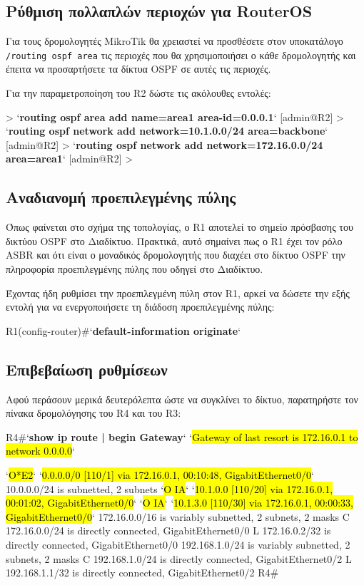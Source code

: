 \documentclass{EdipyLabs} %
\begin{document}
\subsection{Ρύθμιση πολλαπλών περιοχών για RouterOS}

Για τους δρομολογητές MikroTik θα χρειαστεί να προσθέσετε στον υποκατάλογο \texttt{/routing ospf area} τις περιοχές που θα χρησιμοποιήσει ο κάθε δρομολογητής και έπειτα να προσαρτήσετε τα δίκτυα OSPF σε αυτές τις περιοχές. 

Για την παραμετροποίηση του R2 δώστε τις ακόλουθες εντολές:

\begin{CommandBox}
[admin@R2] > `\textbf{routing ospf area add name=area1 area-id=0.0.0.1}`
[admin@R2] > `\textbf{routing ospf network add network=10.1.0.0/24 area=backbone}`
[admin@R2] > `\textbf{routing ospf network add network=172.16.0.0/24 area=area1}`
[admin@R2] >
\end{CommandBox}

\subsection{Αναδιανομή προεπιλεγμένης πύλης}
Όπως φαίνεται στο σχήμα της τοπολογίας, ο R1 αποτελεί το σημείο πρόσβασης του δικτύου OSPF στο Διαδίκτυο. Πρακτικά, αυτό σημαίνει πως ο R1 έχει τον ρόλο ASBR και ότι είναι ο μοναδικός δρομολογητής που διαχέει στο δίκτυο OSPF την πληροφορία προεπιλεγμένης πύλης που οδηγεί στο Διαδίκτυο.

Έχοντας ήδη ρυθμίσει την προεπιλεγμένη πύλη στον R1, αρκεί να δώσετε την εξής εντολή για να ενεργοποιήσετε τη διάδοση προεπιλεγμένης πύλης:

\begin{CommandBox}
R1(config-router)#`\textbf{default-information originate}`
\end{CommandBox}

\subsection{Επιβεβαίωση ρυθμίσεων}

Αφού περάσουν μερικά δευτερόλεπτα ώστε να συγκλίνει το δίκτυο, παρατηρήστε τον πίνακα δρομολόγησης του R4 και του R3:

\begin{CommandBox}
R4#`\textbf{show ip route | begin Gateway}`
`\hl{Gateway of last resort is 172.16.0.1 to network 0.0.0.0}`

`\hl{O*E2}`  `\hl{0.0.0.0/0 [110/1] via 172.16.0.1, 00:10:48, GigabitEthernet0/0}`
      10.0.0.0/24 is subnetted, 2 subnets
`\hl{O IA}`     `\hl{10.1.0.0 [110/20] via 172.16.0.1, 00:01:02, GigabitEthernet0/0}`
`\hl{O IA}`     `\hl{10.1.3.0 [110/30] via 172.16.0.1, 00:00:33, GigabitEthernet0/0}`
      172.16.0.0/16 is variably subnetted, 2 subnets, 2 masks
C        172.16.0.0/24 is directly connected, GigabitEthernet0/0
L        172.16.0.2/32 is directly connected, GigabitEthernet0/0
      192.168.1.0/24 is variably subnetted, 2 subnets, 2 masks
C        192.168.1.0/24 is directly connected, GigabitEthernet0/2
L        192.168.1.1/32 is directly connected, GigabitEthernet0/2
R4#
\end{CommandBox}
\end{document}
